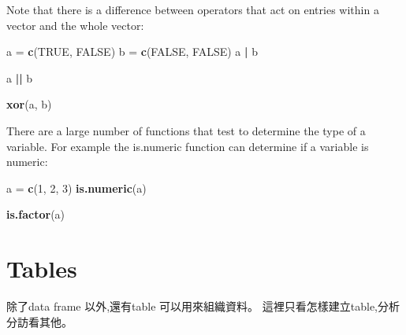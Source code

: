 \documentclass[]{book}
\newenvironment{Shaded}{\begin{snugshade}}{\end{snugshade}}
\newcommand{\DecValTok}[1]{\textcolor[rgb]{0.00,0.00,0.81}{#1}}
\newcommand{\KeywordTok}[1]{\textcolor[rgb]{0.13,0.29,0.53}{\textbf{#1}}}
\newcommand{\NormalTok}[1]{#1}
\newcommand{\OperatorTok}[1]{\textcolor[rgb]{0.81,0.36,0.00}{\textbf{#1}}}
\newcommand{\OtherTok}[1]{\textcolor[rgb]{0.56,0.35,0.01}{#1}}
\newcommand{\StringTok}[1]{\textcolor[rgb]{0.31,0.60,0.02}{#1}}
\theoremstyle{definition}
\theoremstyle{definition}
\theoremstyle{definition}
\theoremstyle{remark}
\begin{document}
Note that there is a difference between operators that act on entries
within a vector and the whole vector:

\begin{Shaded}
\begin{Highlighting}[]
\NormalTok{a =}\StringTok{ }\KeywordTok{c}\NormalTok{(}\OtherTok{TRUE}\NormalTok{, }\OtherTok{FALSE}\NormalTok{)}
\NormalTok{b =}\StringTok{ }\KeywordTok{c}\NormalTok{(}\OtherTok{FALSE}\NormalTok{, }\OtherTok{FALSE}\NormalTok{)}
\NormalTok{a }\OperatorTok{|}\StringTok{ }\NormalTok{b}
\end{Highlighting}
\end{Shaded}

\begin{Shaded}
\begin{Highlighting}[]
\NormalTok{a }\OperatorTok{||}\StringTok{ }\NormalTok{b}
\end{Highlighting}
\end{Shaded}

\begin{Shaded}
\begin{Highlighting}[]
\KeywordTok{xor}\NormalTok{(a, b)}
\end{Highlighting}
\end{Shaded}

There are a large number of functions that test to determine the type of
a variable. For example the is.numeric function can determine if a
variable is numeric:

\begin{Shaded}
\begin{Highlighting}[]
\NormalTok{a =}\StringTok{ }\KeywordTok{c}\NormalTok{(}\DecValTok{1}\NormalTok{, }\DecValTok{2}\NormalTok{, }\DecValTok{3}\NormalTok{)}
\KeywordTok{is.numeric}\NormalTok{(a)}
\end{Highlighting}
\end{Shaded}

\begin{Shaded}
\begin{Highlighting}[]
\KeywordTok{is.factor}\NormalTok{(a)}
\end{Highlighting}
\end{Shaded}

\hypertarget{tables}{%
\section{Tables}\label{tables}}

除了data frame 以外,還有table 可以用來組織資料。
這裡只看怎樣建立table,分析分訪看其他。
\end{document}
